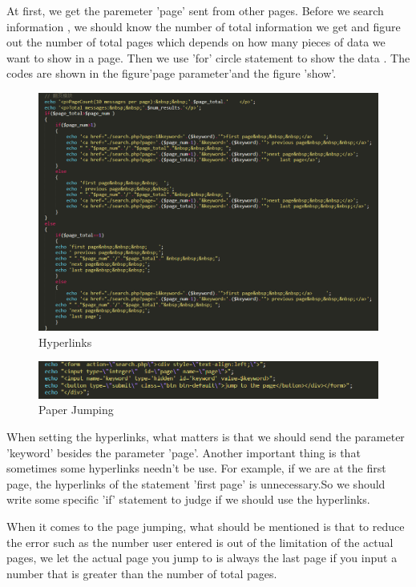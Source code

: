 \documentclass{book}
\begin{document}
At first, we get the paremeter 'page' sent from other pages. Before we search information , we should know the number of total information we get and figure out the number of total pages which depends on how many pieces of data we want to show in a page. Then we use 'for' circle statement to show the data . The codes are shown in the figure'page parameter'and the figure 'show'.



\begin{figure}[H]
\centering
\includegraphics[scale=0.3]{img/dsw_chao.png}
\caption{Hyperlinks}
\end{figure}

\begin{figure}[H]
\centering
\includegraphics[scale=0.35]{img/dsw_input.png}
\caption{Paper Jumping}
\end{figure}

When setting the hyperlinks, what matters is that we should send the parameter 'keyword' besides the parameter 'page'. Another important thing is that sometimes some hyperlinks needn't be use. For example, if we are at the first page, the hyperlinks of the statement 'first page' is unnecessary.So we should write some specific 'if' statement to judge if we should use the hyperlinks.

When it comes to the page jumping, what should be mentioned is that to reduce the error such as the number user entered is out of the limitation of the actual pages, we let the actual page you jump to is always the last page if you input a number that is greater than the number of total pages.
\end{document}
